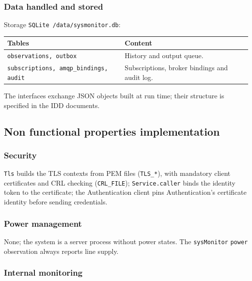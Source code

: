 \documentclass[a4paper]{arrowhead}
\begin{document}
\subsubsection{Data handled and stored}

Storage \texttt{SQLite /\allowbreak{}data/\allowbreak{}sysmonitor.\allowbreak{}db}:

\noindent\begin{longtable}{| p{6.4cm} | p{8.8cm} |} \hline
\rowcolor{gray!33} Tables & Content \\ \hline \endhead
\texttt{observations,\allowbreak{} outbox} & History and output queue. \\ \hline
\texttt{subscriptions,\allowbreak{} amqp\_\allowbreak{}bindings,\allowbreak{} audit} & Subscriptions, broker bindings and audit log. \\ \hline
\end{longtable}

The interfaces exchange JSON objects built at run time; their structure is specified in the IDD documents.

\subsection{Non functional properties implementation}

\subsubsection{Security}

\texttt{Tls} builds the TLS contexts from PEM files (\texttt{TLS\_\allowbreak{}*}), with mandatory client certificates and CRL checking (\texttt{CRL\_\allowbreak{}FILE}); \texttt{Service.\allowbreak{}caller} binds the identity token to the certificate; the Authentication client pins Authentication's certificate identity before sending credentials.

\subsubsection{Power management}

None; the system is a server process without power states. The \texttt{sysMonitor} \texttt{power} observation always reports line supply.

\subsubsection{Internal monitoring}
\end{document}
